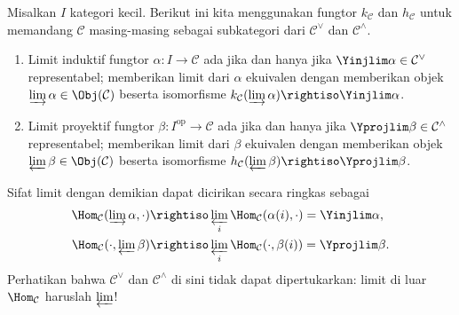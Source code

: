 \begin{proposition}\label{prop:lim-as-fct}
	Misalkan $I$ kategori kecil. Berikut ini kita menggunakan fungtor $k_{\mathcal{C}}$ dan $h_{\mathcal{C}}$ untuk memandang $\mathcal{C}$ masing-masing sebagai subkategori dari $\mathcal{C}^\vee$ dan $\mathcal{C}^\wedge$.
	\begin{enumerate}
		\item Limit induktif fungtor $\alpha: I \to \mathcal{C}$ ada jika dan hanya jika $\Yinjlim \alpha \in \mathcal{C}^\vee$ representabel; memberikan limit dari $\alpha$ ekuivalen dengan memberikan objek $\varinjlim \alpha \in \Obj(\mathcal{C})$ beserta isomorfisme $k_{\mathcal{C}}(\varinjlim \alpha) \rightiso \Yinjlim \alpha$.
		\item Limit proyektif fungtor $\beta: I^\text{op} \to \mathcal{C}$ ada jika dan hanya jika $\Yprojlim \beta \in \mathcal{C}^\wedge$ representabel; memberikan limit dari $\beta$ ekuivalen dengan memberikan objek $\varprojlim \beta \in \Obj(\mathcal{C})$ beserta isomorfisme $h_{\mathcal{C}}(\varprojlim \beta) \rightiso \Yprojlim \beta$.
	\end{enumerate}
\end{proposition}
Sifat limit dengan demikian dapat dicirikan secara ringkas sebagai
\begin{align*}
	\Hom_{\mathcal{C}}(\varinjlim \alpha, \cdot) & \rightiso \varprojlim_i \Hom_{\mathcal{C}}(\alpha(i), \cdot) = \Yinjlim \alpha, \\
	\Hom_{\mathcal{C}}(\cdot, \varprojlim \beta) & \rightiso \varprojlim_i \Hom_{\mathcal{C}}(\cdot, \beta(i)) = \Yprojlim \beta.
\end{align*}
Perhatikan bahwa $\mathcal{C}^\vee$ dan $\mathcal{C}^\wedge$ di sini tidak dapat dipertukarkan: limit di luar $\Hom_{\mathcal{C}}$ haruslah $\varprojlim$!

